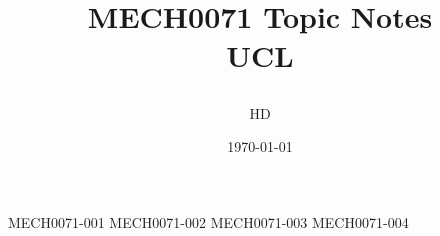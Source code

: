 \documentclass[12pt,a4paper, twoside]{report}
\begin{document}
\title{
{MECH0071 Topic Notes}\\
{\large UCL}
\author{HD}
\date{\today}
}
\maketitle
\tableofcontents
{MECH0071-001}
{MECH0071-002}
{MECH0071-003}
{MECH0071-004}
\end{document}
